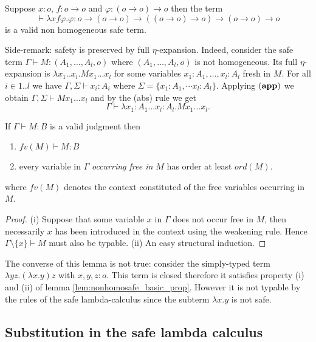 \begin{exmp}
Suppose $x:o$, $f:o\rightarrow o$ and $\varphi:(o\rightarrow
o)\rightarrow o$ then the term $$\vdash \lambda x f \varphi .
\varphi : o \rightarrow (o\rightarrow o) \rightarrow ((o\rightarrow
o)\rightarrow o) \rightarrow (o\rightarrow o)\rightarrow o$$ is
a valid non homogeneous safe term.
\end{exmp}

Side-remark: safety is preserved by full $\eta$-expansion. Indeed,
consider the safe term $\Gamma \vdash M:(A_1,\ldots,A_l,o)$ where
$(A_1,\ldots,A_l,o)$ is not homogeneous. Its full $\eta$-expansion
is $\lambda x_1 .. x_l . M x_1 \dots x_l$ for some variables
$x_1:A_1, \ldots, x_l:A_l$ fresh in $M$. For all $i \in 1..l$ we
have $\Gamma, \Sigma \vdash x_i :A_i$ where $\Sigma = \{ x_1:A_1,
\cdots x_l :A_l \}$. Applying $\mathbf{(app)}$ we obtain $\Gamma,
\Sigma \vdash M x_1 \ldots x_l$ and by the (abs) rule we get
$$\Gamma \vdash \lambda x_1:A_1 \ldots x_l:A_l .M x_1 \ldots x_l.$$


\begin{lem}
\label{lem:nonhomosafe_basic_prop}
If $\Gamma \vdash M : B$ is a valid judgment then
\begin{enumerate}
\item $fv(M) \vdash M : B$
\item every variable in $\Gamma$ \emph{occurring free in $M$} has order at
least $ord(M)$.
\end{enumerate}
where $fv(M)$ denotes the context constituted of the free variables occurring in $M$.
\end{lem}
\begin{proof}
(i) Suppose that some variable $x$ in $\Gamma$ does not occur free
in $M$, then necessarily $x$ has been introduced in the context
using the weakening rule. Hence $\Gamma\setminus \{ x \} \vdash M$
must also be typable. (ii) An easy structural induction.
\end{proof}

The converse of this lemma is not true: consider the simply-typed
term $\lambda y z. (\lambda x . y ) z$ with $x,y,z:o$. This term is
closed therefore it satisfies property (i) and (ii) of lemma
\ref{lem:nonhomosafe_basic_prop}. However it is not typable by the
rules of the safe lambda-calculus since the subterm $\lambda x .y$
is not safe.

\subsection{Substitution in the safe lambda calculus}

